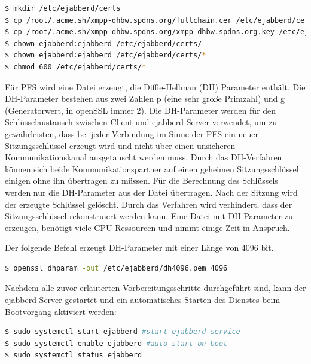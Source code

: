 \documentclass[a4paper,titlepage,halfparskip,12pt]{scrreprt}
\begin{document}
\begin{onehalfspacing}
\begin{lstlisting}[language=bash, caption={Kopieren der Zertifikate in ein Unterverzeichnis und Einschränkung der Rechte},label={lst:ejabberdCerts}]
$ mkdir /etc/ejabberd/certs
$ cp /root/.acme.sh/xmpp-dhbw.spdns.org/fullchain.cer /etc/ejabberd/certs/fullchain.pem
$ cp /root/.acme.sh/xmpp-dhbw.spdns.org/xmpp-dhbw.spdns.org.key /etc/ejabberd/certs/
$ chown ejabberd:ejabberd /etc/ejabberd/certs/
$ chown ejabberd:ejabberd /etc/ejabberd/certs/*
$ chmod 600 /etc/ejabberd/certs/*
\end{lstlisting}

Für \ac{PFS} wird eine Datei erzeugt, die Diffie-Hellman (DH) Parameter enthält. Die DH-Parameter bestehen aus zwei Zahlen p (eine sehr große Primzahl) und g (Generatorwert, in openSSL immer 2). Die DH-Parameter werden für den Schlüsselaustausch zwischen Client und ejabberd-Server verwendet, um zu gewährleisten, dass bei jeder Verbindung im Sinne der \ac{PFS} ein neuer Sitzungsschlüssel erzeugt wird und nicht über einen unsicheren Kommunikationskanal ausgetauscht werden muss. Durch das DH-Verfahren können sich beide Kommunikationspartner auf einen geheimen Sitzungsschlüssel einigen ohne ihn übertragen zu müssen. Für die Berechnung des Schlüssels werden nur die DH-Parameter aus der Datei übertragen. Nach der Sitzung wird der erzeugte Schlüssel gelöscht. Durch das Verfahren wird verhindert, dass der Sitzungsschlüssel rekonstruiert werden kann. Eine Datei mit DH-Parameter zu erzeugen, benötigt viele CPU-Ressourcen und nimmt einige Zeit in Anspruch.\cite{perfectForwardSecrecy}

Der folgende Befehl erzeugt DH-Parameter mit einer Länge von 4096 bit.

\bigskip

\begin{lstlisting}[language=bash, caption={Erzeugen von Diffie-Hellman-Parametern für den ejabberd-Server},label={lst:DHParameters}]
$ openssl dhparam -out /etc/ejabberd/dh4096.pem 4096
\end{lstlisting}

Nachdem alle zuvor erläuterten Vorbereitungsschritte durchgeführt sind, kann der ejabberd-Server gestartet und ein automatisches Starten des Dienstes beim Bootvorgang aktiviert werden:

\bigskip

\begin{lstlisting}[language=bash, caption={Starten der ejabberd-Instanz}]
$ sudo systemctl start ejabberd #start ejabberd service
$ sudo systemctl enable ejabberd #auto start on boot
$ sudo systemctl status ejabberd
\end{lstlisting}


\end{onehalfspacing}
\end{document}
